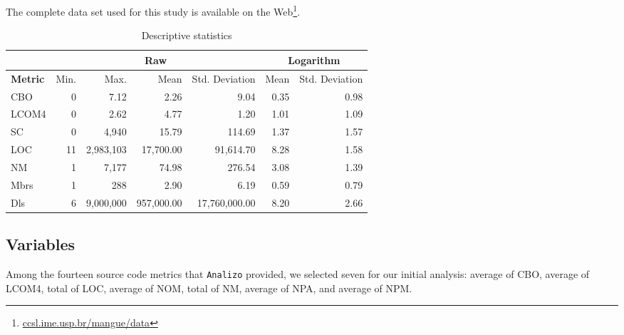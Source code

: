 \documentclass[conference]{IEEEtran}
\begin{document}
The complete data set used for this study is available on the Web\footnote{\url{ccsl.ime.usp.br/mangue/data}}.

\begin{center}
\begin{table*}[hbt]
\centering \caption{Descriptive statistics}
\begin{tabular}{|l|r|r|r|r|r|r|} \hline
  & \multicolumn{4}{|c|}{Raw} & \multicolumn{2}{|c|}{Logarithm}\\ \hline

\textbf{Metric} & Min. & Max. & Mean & Std. Deviation & Mean & Std. Deviation \\ \hline

CBO & 0 & 7.12 & 2.26 & 9.04 & 0.35 & 0.98 \\ \hline

LCOM4 & 0 & 2.62 & 4.77 & 1.20 & 1.01 & 1.09 \\ \hline

SC & 0 & 4,940 & 15.79 & 114.69 & 1.37 & 1.57 \\ \hline

LOC & 11 & 2,983,103 & 17,700.00 & 91,614.70 & 8.28 & 1.58 \\ \hline

NM & 1 & 7,177 & 74.98 & 276.54 & 3.08 & 1.39 \\ \hline

Mbrs & 1 & 288 & 2.90 & 6.19 & 0.59 & 0.79 \\ \hline

Dls & 6 & 9,000,000 & 957,000.00 & 17,760,000.00 & 8.20 & 2.66 \\ \hline

\end{tabular}
\label{table:statistics}
\end{table*}
\end{center}
\vspace{-1em}

\subsection{Variables}
\label{variables}

Among the fourteen source code metrics that \texttt{Analizo} provided, we selected seven for our initial analysis: 
average of CBO, average of LCOM4, total of LOC, average of NOM, total of NM, average of NPA, and average of NPM.
\end{document}
